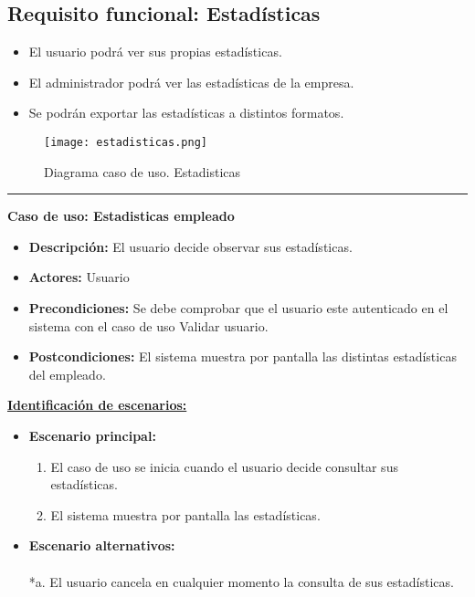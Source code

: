 \subsection{Requisito funcional: Estadísticas}

\begin{itemize}
 \item El usuario podrá ver sus propias estadísticas.
 \item El administrador podrá ver las estadísticas de la empresa.
 \item Se podrán exportar las estadísticas a distintos formatos.

\end{itemize}
\begin{figure}[H]
  \centering
    \texttt{[image: estadisticas.png]}
  \caption{Diagrama caso de uso. Estadisticas}
  \label{cu8}
\end{figure}
\smallskip
\hrule height 1pt
\smallskip
\textbf{Caso de uso: Estadisticas empleado}
\begin{itemize}\renewcommand{\labelitemi}{$\cdot$}
  \item \textbf{Descripción:} El usuario decide observar sus estadísticas.
  \item \textbf{Actores:} Usuario
  \item \textbf{Precondiciones:} Se debe comprobar que el usuario este autenticado en el sistema con el caso de uso Validar usuario.
  \item \textbf{Postcondiciones:} El sistema muestra por pantalla las distintas estadísticas del empleado.
\end{itemize}
\underline{\textbf{Identificación de escenarios:}}
\begin{itemize}\renewcommand{\labelitemi}{$\circ$}
 \item \textbf{Escenario principal:}
         \begin{enumerate}
          \item El caso de uso se inicia cuando el usuario decide consultar sus estadísticas.
          \item El sistema muestra por pantalla las estadísticas.
         \end{enumerate}
  \item \textbf{Escenario alternativos:}\\\\
          *a. El usuario cancela en cualquier momento la consulta de sus estadísticas.
\end{itemize}

